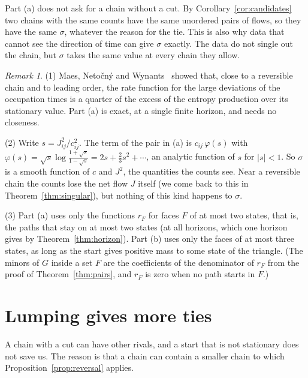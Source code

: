 \documentclass[11pt]{article}
\theoremstyle{definition}
\theoremstyle{remark}
\newtheorem{remark}[theorem]{Remark}
\begin{document}
Part (a) does not ask for a chain without a cut. By
Corollary~\ref{cor:candidates} two chains with the same counts have the same
unordered pairs of flows, so they have the same $\sigma$, whatever the reason
for the tie. This is also why data that cannot see the direction of time can
give $\sigma$ exactly. The data do not single out the chain, but $\sigma$ takes
the same value at every chain they allow.

\begin{remark}\label{rem:sigma-smooth}
(1) Maes, Neto\v{c}n\'y and Wynants~\cite{mnw2008} showed that, close to a
reversible chain and to leading order, the rate function for the large
deviations of the occupation times is a quarter of the excess of the entropy
production over its stationary value. Part (a) is exact, at a single finite
horizon, and needs no closeness.

(2) Write $s=J_{ij}^2/c_{ij}^2$. The term of the pair in (a) is
$c_{ij}\,\varphi(s)$ with $\varphi(s)=\sqrt s\log\frac{1+\sqrt s}{1-\sqrt s}
=2s+\frac23s^2+\cdots$, an analytic function of $s$ for $\lvert s\rvert<1$. So
$\sigma$ is a smooth function of $c$ and $J^2$, the quantities the counts see.
Near a reversible chain the counts lose the net flow $J$ itself (we come back
to this in Theorem~\ref{thm:singular}), but nothing of this kind happens to
$\sigma$.

(3) Part (a) uses only the functions $r_F$ for faces $F$ of at most two
states, that is, the paths that stay on at most two states (at all horizons,
which one horizon gives by Theorem~\ref{thm:horizon}). Part (b) uses only the
faces of at most three states, as long as the start gives
positive mass to some state of the triangle. (The minors of $G$ inside a set
$F$ are the coefficients of the denominator of $r_F$ from the proof of
Theorem~\ref{thm:pairs}, and $r_F$ is zero when no path starts in $F$.)
\end{remark}

\section{Lumping gives more ties}\label{sec:lumping}

A chain with a cut can have other rivals, and a start that is not stationary
does not save us. The reason is that a chain can contain a smaller chain to
which Proposition~\ref{prop:reversal} applies.
\end{document}
